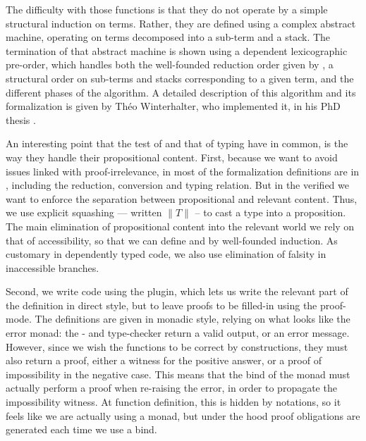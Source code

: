The difficulty with those functions is that they do not operate by a simple structural induction on
terms. Rather, they are defined using a complex abstract machine, operating on terms decomposed into
a sub-term and a stack. The termination of that abstract machine is shown using a
dependent lexicographic pre-order, which handles both the well-founded reduction order given by
, a structural order on sub-terms and stacks corresponding to a given term, and
the different phases of the algorithm.
A detailed description of this algorithm and its formalization%
 is given by Théo Winterhalter,
who implemented it,%
in his PhD thesis .

An interesting point that the test of  and that of typing have in
common, is the way they handle their propositional content. First, because
we want to avoid issues linked with proof-irrelevance,
in most of the formalization definitions are in ,
including the reduction, conversion and typing relation.
But in the verified  we want to enforce the
separation between propositional and relevant content. Thus, we use explicit squashing —
written $\| T \|$ – to cast a type into a proposition.%
The main elimination of propositional content into the relevant world we rely on that
of accessibility, so that we can define  and  by well-founded induction. As customary in dependently typed code, we also use elimination of falsity in
inaccessible branches.

Second, we write code using the  plugin, which lets us write the
relevant part of the definition in direct style, but to leave proofs to be filled-in using the
proof-mode. The definitions are given in monadic style, relying on what looks like the error monad:%
the - and type-checker return a valid output, or an error message. However, since
we wish the functions to be correct by constructions, they must also return a proof, either a
witness for the positive answer, or a proof of impossibility in the negative case.
This means that the bind of the monad must actually perform a proof when re-raising the error,
in order to propagate the impossibility witness.%
At function definition, this is hidden by notations, so it feels like we are actually using a
monad, but under the hood proof obligations are generated each time we use a bind.

